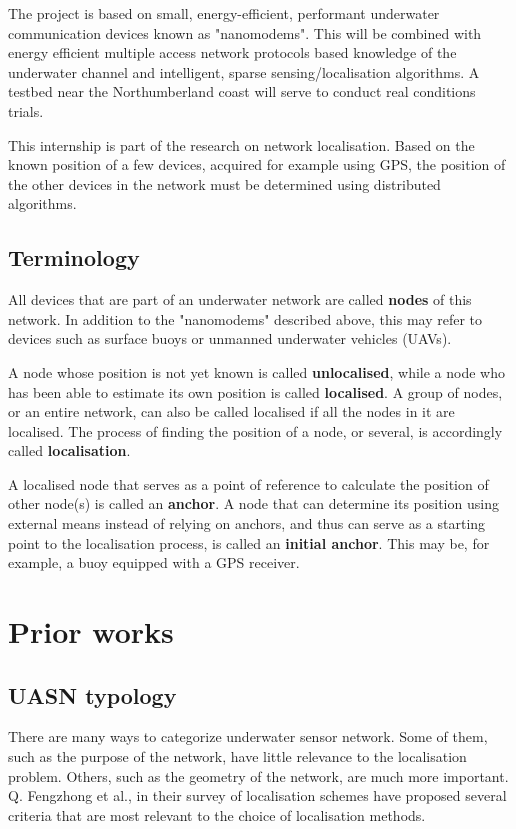 \documentclass[12pt,a4paper,fleqn]{report}
\begin{document}
The project is based on small, energy-efficient, performant underwater communication devices known as "nanomodems". This will be combined with energy efficient multiple access network protocols based knowledge of the underwater channel and intelligent, sparse sensing/localisation algorithms. A testbed near the Northumberland coast will serve to conduct real conditions trials.

This internship is part of the research on network localisation. Based on the known position of a few devices, acquired for example using GPS, the position of the other devices in the network must be determined using distributed algorithms.

\section{Terminology}

All devices that are part of an underwater network are called \textbf{nodes} of this network. In addition to the "nanomodems" described above, this may refer to devices such as surface buoys or unmanned underwater vehicles (UAVs).

A node whose position is not yet known is called \textbf{unlocalised}, while a node who has been able to estimate its own position is called \textbf{localised}. A group of nodes, or an entire network, can also be called localised if all the nodes in it are localised. The process of finding the position of a node, or several, is accordingly called \textbf{localisation}.

A localised node that serves as a point of reference to calculate the position of other node(s) is called an \textbf{anchor}. A node that can determine its position using external means instead of relying on anchors, and thus can serve as a starting point to the localisation process, is called an \textbf{initial anchor}. This may be, for example, a buoy equipped with a GPS receiver.

\chapter{Prior works}

\section{UASN typology}

There are many ways to categorize underwater sensor network. Some of them, such as the purpose of the network, have little relevance to the localisation problem. Others, such as the geometry of the network, are much more important. Q. Fengzhong et al., in their survey of localisation schemes \cite{survey} have proposed several criteria that are most relevant to the choice of localisation methods.
\end{document}
